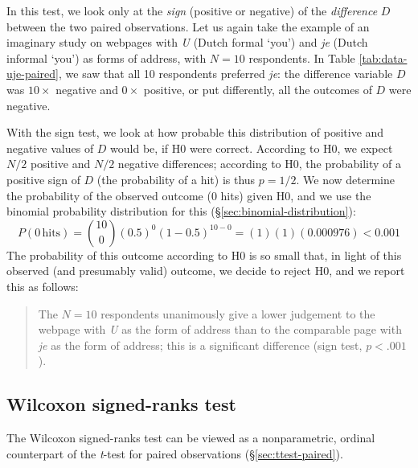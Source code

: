 \documentclass[
]{book}
\begin{document}
In this test, we look only at the \emph{sign} (positive or negative)
of the \emph{difference} \(D\) between the two paired observations. Let us again
take the example of an imaginary study on webpages with
\emph{U} (Dutch formal `you') and \emph{je} (Dutch informal `you') as forms of address, with
\(N=10\) respondents. In Table \ref{tab:data-uje-paired}, we saw
that all 10 respondents preferred \emph{je}: the difference variable \(D\) was
\(10\times\) negative and \(0\times\) positive, or put differently, all the outcomes
of \(D\) were negative.

With the sign test, we look at how probable this distribution of positive and
negative values of \(D\) would be, if H0 were correct. According to
H0, we expect \(N/2\) positive and \(N/2\) negative differences; according to
H0, the probability of a positive sign of \(D\) (the probability of a hit) is thus
\(p=1/2\). We now determine the probability of the observed outcome (0 hits)
given H0, and we use the binomial probability distribution for this
(§\ref{sec:binomial-distribution}):
\begin{equation}
  \label{eq:prob-binom-uje}
    P(0\,\mbox{hits}) = {10 \choose 0} (0.5)^0 (1-0.5)^{10-0} = (1) (1) (0.000976) < 0.001
\end{equation}
The probability of this outcome according to H0 is so small that, in light of this
observed (and presumably valid) outcome, we decide to reject H0, and we report this as
follows:

\begin{quote}
The \(N=10\) respondents unanimously give a lower judgement to the
webpage with \emph{U} as the form of address than to the comparable page
with \emph{je} as the form of address; this is a significant difference
(sign test, \(p<.001\)).
\end{quote}

\hypertarget{sec:Wilcoxon-signed-rank}{%
\subsection{Wilcoxon signed-ranks test}\label{sec:Wilcoxon-signed-rank}}

The Wilcoxon signed-ranks test can be viewed as a
nonparametric, ordinal counterpart of the \emph{t}-test for paired
observations (§\ref{sec:ttest-paired}).
\end{document}
